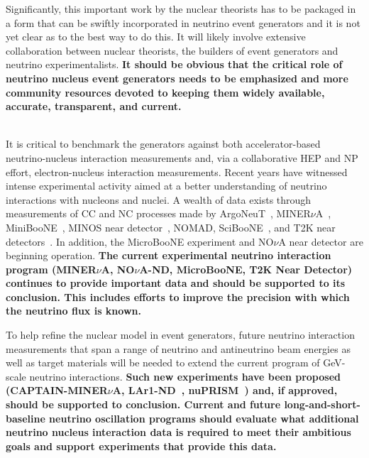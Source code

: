 Significantly, this important work by the nuclear theorists has to be packaged in a form that can be swiftly incorporated in neutrino event generators and it is not yet clear as to the best way to do this. It will likely involve extensive collaboration between nuclear theorists, the builders of event generators and neutrino experimentalists.   {\bf It should be obvious that the critical role of neutrino nucleus event generators needs to be emphasized and more community resources devoted to keeping them widely available, accurate, transparent, and current.}

\\It is critical to benchmark the generators against both accelerator-based neutrino-nucleus interaction measurements and, via a collaborative HEP and NP effort, electron-nucleus interaction measurements.  Recent years have witnessed intense experimental activity aimed at a better understanding of neutrino interactions with nucleons and nuclei. A wealth of data exists through measurements of CC and NC processes made by ArgoNeuT~\cite{Acciarri:2014}, MINER$\nu$A~\cite{MINERvA}, MiniBooNE~\cite{miniboone}, MINOS near detector~\cite{minos}, NOMAD, SciBooNE~\cite{sciboone}, and T2K near detectors~\cite{Abe:2014nox}. In addition, the MicroBooNE experiment and NO$\nu$A near detector are beginning operation.  {\bf The current experimental neutrino interaction program (MINER$\nu$A, NO$\nu$A-ND, MicroBooNE, T2K Near Detector) continues to provide important data and should be supported to its conclusion. This includes efforts to improve the precision with which the neutrino flux is known.}  
 
To help refine the nuclear model in event generators, future neutrino interaction measurements that span a range of neutrino and antineutrino beam energies as well as target materials will be needed to extend the current program of GeV-scale neutrino interactions. {\bf Such new experiments have been proposed (CAPTAIN-MINER$\nu$A, LAr1-ND~\cite{Adams:2013uaa}, nuPRISM~\cite{Bhadra:2014oma}) and, if approved, should be supported to conclusion. Current and future long-and-short- baseline neutrino oscillation programs should evaluate what additional neutrino nucleus interaction data is required to meet their ambitious goals and support experiments that provide this data.} 

